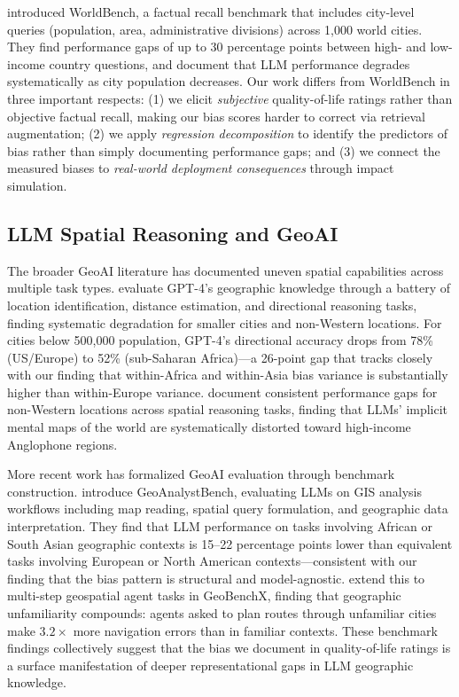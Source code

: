 \documentclass[12pt]{article}
\begin{document}
\citet{moayeri2024worldbench} introduced WorldBench, a factual recall benchmark that includes city-level queries (population, area, administrative divisions) across 1,000 world cities. They find performance gaps of up to 30 percentage points between high- and low-income country questions, and document that LLM performance degrades systematically as city population decreases. Our work differs from WorldBench in three important respects: (1) we elicit \emph{subjective} quality-of-life ratings rather than objective factual recall, making our bias scores harder to correct via retrieval augmentation; (2) we apply \emph{regression decomposition} to identify the predictors of bias rather than simply documenting performance gaps; and (3) we connect the measured biases to \emph{real-world deployment consequences} through impact simulation.

\subsection{LLM Spatial Reasoning and GeoAI}

The broader GeoAI literature has documented uneven spatial capabilities across multiple task types. \citet{roberts2023gpt4geo} evaluate GPT-4's geographic knowledge through a battery of location identification, distance estimation, and directional reasoning tasks, finding systematic degradation for smaller cities and non-Western locations. For cities below 500,000 population, GPT-4's directional accuracy drops from 78\% (US/Europe) to 52\% (sub-Saharan Africa)---a 26-point gap that tracks closely with our finding that within-Africa and within-Asia bias variance is substantially higher than within-Europe variance. \citet{bhandari2023llm} document consistent performance gaps for non-Western locations across spatial reasoning tasks, finding that LLMs' implicit mental maps of the world are systematically distorted toward high-income Anglophone regions.

More recent work has formalized GeoAI evaluation through benchmark construction. \citet{zhang2025geoanalystbench} introduce GeoAnalystBench, evaluating LLMs on GIS analysis workflows including map reading, spatial query formulation, and geographic data interpretation. They find that LLM performance on tasks involving African or South Asian geographic contexts is 15--22 percentage points lower than equivalent tasks involving European or North American contexts---consistent with our finding that the bias pattern is structural and model-agnostic. \citet{krechetova2025geobenchx} extend this to multi-step geospatial agent tasks in GeoBenchX, finding that geographic unfamiliarity compounds: agents asked to plan routes through unfamiliar cities make $3.2\times$ more navigation errors than in familiar contexts. These benchmark findings collectively suggest that the bias we document in quality-of-life ratings is a surface manifestation of deeper representational gaps in LLM geographic knowledge.
\end{document}
